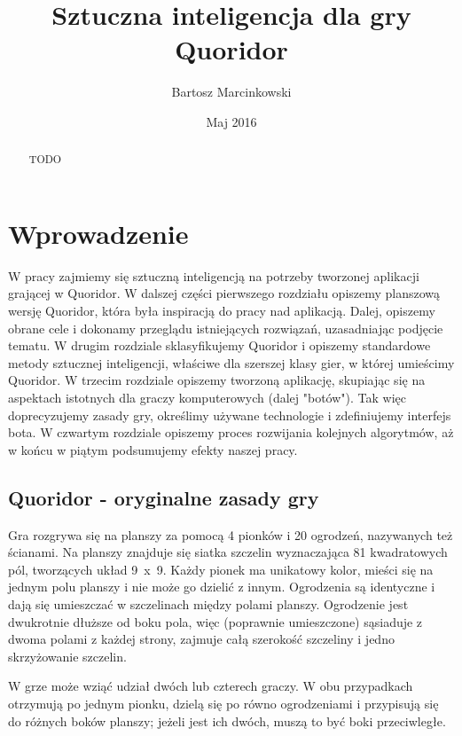 \documentclass{pracamgr}
\author{Bartosz Marcinkowski}
\title{Sztuczna inteligencja dla gry Quoridor}
\date{Maj 2016}
\begin{document}
\maketitle

\begin{abstract}
TODO
\end{abstract}

\tableofcontents


\chapter{Wprowadzenie}

W pracy zajmiemy się sztuczną inteligencją na potrzeby tworzonej aplikacji grającej w Quoridor. W dalszej części pierwszego rozdziału opiszemy planszową wersję Quoridor, która była inspiracją do pracy nad aplikacją. Dalej, opiszemy obrane cele i dokonamy przeglądu istniejących rozwiązań, uzasadniając podjęcie tematu.
W drugim rozdziale sklasyfikujemy Quoridor i opiszemy standardowe metody sztucznej inteligencji, właściwe dla szerszej klasy gier, w której umieścimy Quoridor.
W trzecim rozdziale opiszemy tworzoną aplikację, skupiając się na aspektach istotnych dla graczy komputerowych (dalej "botów"). Tak więc doprecyzujemy zasady gry, określimy używane technologie i zdefiniujemy interfejs bota.
W czwartym rozdziale opiszemy proces rozwijania kolejnych algorytmów, aż w końcu w piątym podsumujemy efekty naszej pracy.

\section{Quoridor - oryginalne zasady gry}

Gra rozgrywa się na planszy za pomocą 4 pionków i 20 ogrodzeń, nazywanych też ścianami. Na planszy znajduje się siatka szczelin wyznaczająca 81 kwadratowych pól, tworzących układ 9~x~9. Każdy pionek ma unikatowy kolor, mieści się na jednym polu planszy i nie może go dzielić z innym. Ogrodzenia są identyczne i dają się umieszczać w szczelinach między polami planszy. Ogrodzenie jest dwukrotnie dłuższe od boku pola, więc (poprawnie umieszczone) sąsiaduje z dwoma polami z każdej strony, zajmuje całą szerokość szczeliny i jedno skrzyżowanie szczelin.

W grze może wziąć udział dwóch lub czterech graczy. W obu przypadkach otrzymują po jednym pionku, dzielą się po równo ogrodzeniami i przypisują się do różnych boków planszy; jeżeli jest ich dwóch, muszą to być boki przeciwległe.
\end{document}
